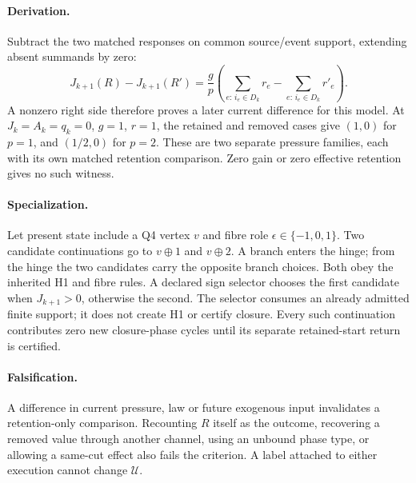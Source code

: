 \paragraph{Derivation.}
Subtract the two matched
responses on common source/event support, extending absent summands by zero:
\begin{equation}
 J_{k+1}(R)-J_{k+1}(R')
 =\frac{g}{p}\left(\sum_{e:\,i_e\in D_k}r_e-
                         \sum_{e:\,i_e\in D_k}r'_e\right).
 \label{eq:awareness-causal-difference}
\end{equation}
A nonzero right side therefore proves a later current difference for this
model. At \(J_k=A_k=q_k=0\), \(g=1\), \(r=1\), the retained and removed cases
give \((1,0)\) for \(p=1\), and \((1/2,0)\) for \(p=2\). These are two
separate pressure families, each with its own matched retention comparison.
Zero gain or zero effective retention gives no such witness.

\paragraph{Specialization.}
Let present state include a Q4 vertex \(v\) and fibre role
\(\epsilon\in\{-1,0,1\}\). Two candidate continuations go to \(v\oplus1\)
and \(v\oplus2\). A branch enters the hinge; from the hinge the two candidates
carry the opposite branch choices. Both obey the inherited H1 and fibre
rules. A declared sign selector chooses the first candidate when
\(J_{k+1}>0\), otherwise the second. The selector consumes an already
admitted finite support; it does not create H1 or certify closure. Every
such continuation contributes zero new closure-phase cycles until its separate
retained-start return is certified.

\paragraph{Falsification.}
A difference in current pressure, law or future exogenous input invalidates
a retention-only comparison. Recounting \(R\) itself as the outcome,
recovering a removed value through another channel, using an unbound
phase type, or allowing a same-cut effect also fails the criterion.
A label attached to either execution cannot change \(\mathcal U\).


